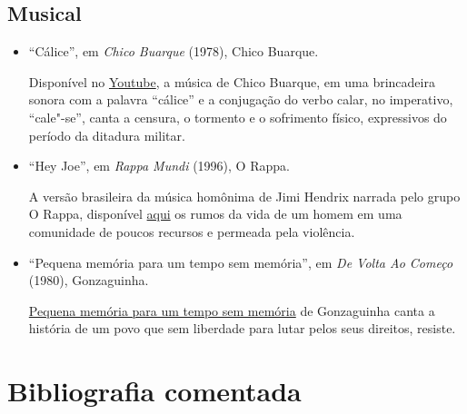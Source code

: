 \documentclass[11pt]{extarticle}
\begin{document}
\subsection{Musical}

\begin{itemize}
\item``Cálice'', em \emph{Chico Buarque} (1978), Chico Buarque.

Disponível no \href{https://www.youtube.com/watch?v=9y2xB90A0CY&ab_channel=ChicoBuarque-Topic}{Youtube}, a música de Chico Buarque, em uma brincadeira sonora com a palavra ``cálice'' e a conjugação do verbo calar, no imperativo, ``cale"-se'',
canta a censura, o tormento e o sofrimento físico, expressivos do período da ditadura militar.


\item``Hey Joe'', em \emph{Rappa Mundi} (1996), O Rappa.

A versão brasileira da música homônima de Jimi Hendrix narrada pelo grupo O Rappa, disponível \href{https://www.youtube.com/watch?v=4yS9fXaeqss&ab_channel=Leandrocururu}{aqui} os rumos 
da vida de um homem em uma comunidade de poucos recursos e permeada pela violência. 

\item``Pequena memória para um tempo sem memória'', em \emph{De Volta Ao Começo} (1980), Gonzaguinha.

\href{https://www.youtube.com/watch?v=SJ_1pjnW2Lg&ab_channel=fdbb1}{Pequena memória para um tempo sem memória} de Gonzaguinha 
canta a história de um povo que sem liberdade para lutar pelos seus direitos, resiste.

\end{itemize}

\section{Bibliografia comentada}
\end{document}
